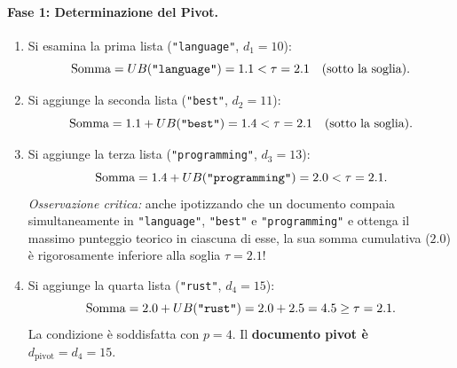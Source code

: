 \paragraph{Fase 1: Determinazione del Pivot.}
\begin{enumerate}
    \item Si esamina la prima lista (\texttt{"language"}, $d_1 = 10$):
    \begin{equation*}
        \text{Somma} = UB(\text{\texttt{"language"}}) = 1.1 < \tau = 2.1 \quad (\text{sotto la soglia}).
    \end{equation*}
    \item Si aggiunge la seconda lista (\texttt{"best"}, $d_2 = 11$):
    \begin{equation*}
        \text{Somma} = 1.1 + UB(\text{\texttt{"best"}}) = 1.4 < \tau = 2.1 \quad (\text{sotto la soglia}).
    \end{equation*}
    \item Si aggiunge la terza lista (\texttt{"programming"}, $d_3 = 13$):
    \begin{equation*}
        \text{Somma} = 1.4 + UB(\text{\texttt{"programming"}}) = 2.0 < \tau = 2.1.
    \end{equation*}
    \textit{Osservazione critica:} anche ipotizzando che un documento compaia simultaneamente in \texttt{"language"}, \texttt{"best"} e \texttt{"programming"} e ottenga il massimo punteggio teorico in ciascuna di esse, la sua somma cumulativa ($2.0$) \`e rigorosamente inferiore alla soglia $\tau = 2.1$!
    \item Si aggiunge la quarta lista (\texttt{"rust"}, $d_4 = 15$):
    \begin{equation*}
        \text{Somma} = 2.0 + UB(\text{\texttt{"rust"}}) = 2.0 + 2.5 = 4.5 \ge \tau = 2.1.
    \end{equation*}
    La condizione \`e soddisfatta con $p = 4$. Il \textbf{documento pivot \`e $d_{\text{pivot}} = d_4 = 15$}.
\end{enumerate}

